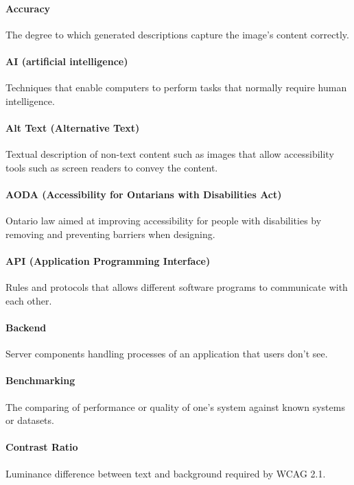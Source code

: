 \documentclass[12pt]{article}
\begin{document}
\paragraph*{Accuracy}
The degree to which generated descriptions capture the image’s content correctly.

\paragraph*{AI (artificial intelligence)}
Techniques that enable computers to perform tasks that normally require human intelligence.

\paragraph*{Alt Text (Alternative Text)}
Textual description of non-text content such as images that allow accessibility tools such as screen readers to convey the content.

\paragraph*{AODA (Accessibility for Ontarians with Disabilities Act)}
Ontario law aimed at improving accessibility for people with disabilities by removing and preventing barriers when designing.

\paragraph*{API (Application Programming Interface)}
Rules and protocols that allows different software programs to communicate with each other.

\paragraph*{Backend}
Server components handling processes of an application that users don't see.

\paragraph*{Benchmarking}
The comparing of performance or quality of one's system against known systems or datasets.

\paragraph*{Contrast Ratio}
Luminance difference between text and background required by WCAG 2.1.
\end{document}
